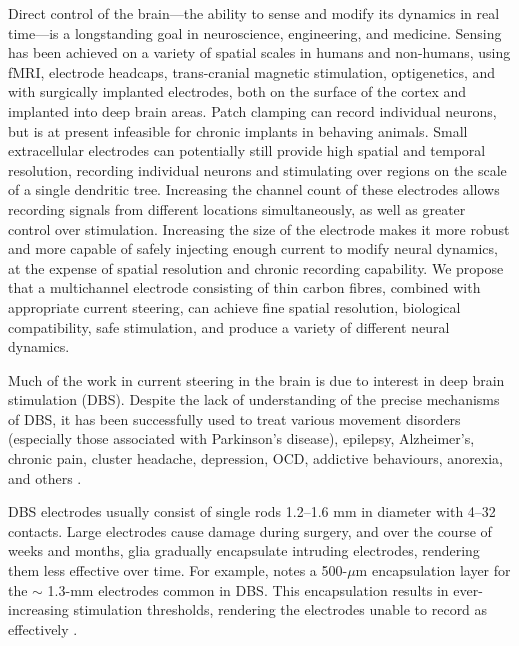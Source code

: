 \documentclass[10pt,letterpaper]{article}
\begin{document}
Direct control of the brain---the ability to sense and modify its
dynamics in real time---is a longstanding goal in neuroscience,
engineering, and medicine. Sensing has been achieved on a variety of
spatial scales in humans and non-humans, using fMRI, electrode
headcaps, trans-cranial magnetic stimulation, optigenetics, and with
surgically implanted electrodes, both on the surface of the cortex and
implanted into deep brain areas. Patch clamping can record individual
neurons, but is at present infeasible for chronic implants in behaving
animals. Small extracellular electrodes can potentially still provide
high spatial and temporal resolution, recording individual neurons and
stimulating over regions on the scale of a single dendritic
tree. Increasing the channel count of these electrodes allows
recording signals from different locations simultaneously, as well as
greater control over stimulation. Increasing the size of the electrode
makes it more robust and more capable of safely injecting enough
current to modify neural dynamics, at the expense of spatial
resolution and chronic recording capability. We propose that a
multichannel electrode consisting of thin carbon fibres, combined with
appropriate current steering, can achieve fine spatial resolution,
biological compatibility, safe stimulation, and produce a variety of
different neural dynamics.

Much of the work in current steering in the brain is due to interest
in deep brain stimulation (DBS).  Despite the lack of understanding of
the precise mechanisms of DBS, it has been successfully used to treat
various movement disorders (especially those associated with
Parkinson's disease), epilepsy, Alzheimer's, chronic pain, cluster
headache, depression, OCD, addictive behaviours, anorexia, and others
\cite{Udupa2015dbs}.

DBS electrodes usually consist of single rods 1.2--1.6 mm in diameter
with 4--32 contacts. Large electrodes cause damage during surgery, and
over the course of weeks and months, glia gradually encapsulate
intruding electrodes, rendering them less effective over time. For
example, \cite{Butson2008steering} notes a 500-$\mu$m encapsulation
layer for the $\sim$ 1.3-mm electrodes common in DBS.  This
encapsulation results in ever-increasing stimulation thresholds,
rendering the electrodes unable to record as effectively
\cite{Barrese2016electrodestability,Biran2005gliosis,Polikov2005gliosis,Winslow2010gliosis}.
\end{document}
